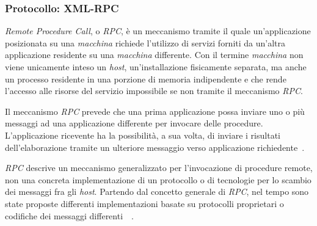
\subsubsection{Protocollo: XML-RPC}

\emph{Remote Procedure Call}, o \emph{RPC}, è un meccanismo tramite il quale un'applicazione posizionata su una \emph{macchina} richiede l'utilizzo di servizi forniti da un'altra applicazione residente su una \emph{macchina} differente. Con il termine \emph{macchina} non viene unicamente inteso un \emph{host}, un'installazione fisicamente separata, ma anche un processo residente in una porzione di memoria indipendente e che rende l'accesso alle risorse del servizio impossibile se non tramite il meccanismo \emph{RPC}. 

Il meccanismo \emph{RPC} prevede che una prima applicazione possa inviare uno o più messaggi ad una applicazione differente per invocare delle procedure. L'applicazione ricevente ha la possibilità,  a sua volta, di inviare i risultati dell'elaborazione tramite un ulteriore messaggio verso applicazione richiedente~\cite{MERRICK:2006:misc}.

\emph{RPC} descrive un meccanismo generalizzato per l'invocazione di procedure remote, non una concreta implementazione di un protocollo o di tecnologie per lo scambio dei messaggi fra gli \emph{host}. Partendo dal concetto generale di \emph{RPC}, nel tempo sono state proposte differenti implementazioni basate su protocolli proprietari o codifiche dei messaggi differenti~\cite{JAIRATH:2004:misc}~\cite{dcerpc}.

